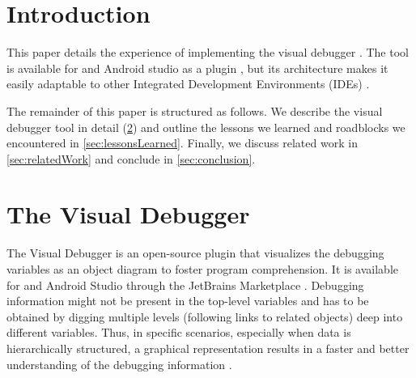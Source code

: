 \documentclass[sigconf]{acmart}
\begin{document}

\maketitle

\section{Introduction}
This paper details the experience of implementing the visual debugger \cite{krauterVisualDebuggerTool2022}.
The tool is available for \intellij and Android studio as a plugin \cite{timkrauterVisualDebuggerIntelliJ2023}, but its architecture makes it easily adaptable to other Integrated Development Environments (IDEs) \cite{krauterVisualDebuggerTool2022}.


The remainder of this paper is structured as follows.
We describe the visual debugger tool in detail (\cref{sec:visualDebugger}) and outline the lessons we learned and roadblocks we encountered in \cref{sec:lessonsLearned}.
Finally, we discuss related work in \cref{sec:relatedWork} and conclude in \cref{sec:conclusion}.


\section{The Visual Debugger} \label{sec:visualDebugger}
The Visual Debugger is an open-source \intellij plugin that visualizes the debugging variables as an object diagram to foster program comprehension.
It is available for \intellij and Android Studio through the JetBrains Marketplace \cite{timkrauterVisualDebuggerIntelliJ2023, timkrauterVisualDebuggerTool2023}.
Debugging information might not be present in the top-level variables and has to be obtained by digging multiple levels (following links to related objects) deep into different variables.
Thus, in specific scenarios, especially when data is hierarchically structured, a graphical representation results in a faster and better understanding of the debugging information \cite{krauterVisualDebuggerTool2022}.
\end{document}
